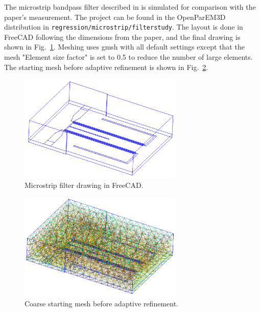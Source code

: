 \documentclass[titlepage]{article}
\renewcommand\_{\textunderscore\linebreak[1]}
\begin{document}
The microstrip bandpass filter described in \cite{Weng} is simulated for comparison with the paper's measurement.  The project can be found in the OpenParEM3D distribution in \texttt{regression/microstrip/filter\_study}.  The layout is done in FreeCAD \cite{FreeCAD} following the dimensions from the paper, and the final drawing is shown in Fig.~\ref{fig:filter_drawing}.  Meshing uses gmsh \cite{gmsh}\cite{gmshweb} with all default settings except that the mesh "Element size factor" is set to 0.5 to reduce the number of large elements.  The starting mesh before adaptive refinement is shown in Fig.~\ref{fig:filter_starting_mesh}.
\begin{figure}[H]
  \centering
  \includegraphics[width=0.7\textwidth]{../regression/OpenParEM3D/microstrip/filter_study/screenshots/filter_drawing}
  \caption{Microstrip filter drawing in FreeCAD.}
  \label{fig:filter_drawing}
\end{figure}
\begin{figure}[H]
  \centering
  \includegraphics[width=0.7\textwidth]{../regression/OpenParEM3D/microstrip/filter_study/screenshots/filter_starting_mesh}
  \caption{Coarse starting mesh before adaptive refinement.}
  \label{fig:filter_starting_mesh}
\end{figure}
\end{document}
